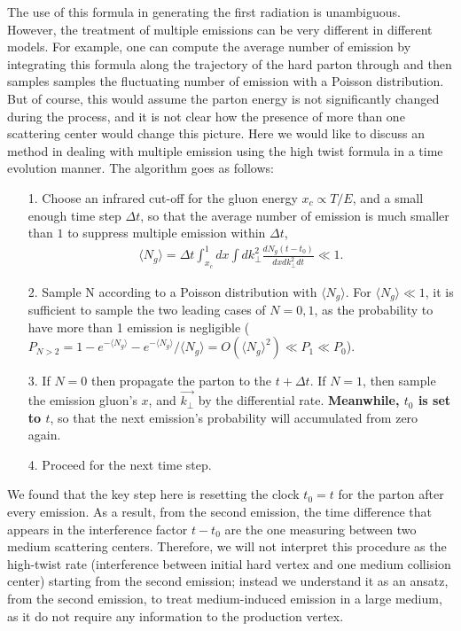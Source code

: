 The use of this formula in generating the first radiation is unambiguous. 
However, the treatment of multiple emissions can be very different in different models.
For example, one can compute the average number of emission by integrating this formula along the trajectory of the hard parton through and then samples samples the fluctuating number of emission with a Poisson distribution.
But of course, this would assume the parton energy is not significantly changed during the process, and it is not clear how the presence of more than one scattering center would change this picture.
Here we would like to discuss an method in dealing with multiple emission using the high twist formula in a time evolution manner.
The algorithm goes as follows:
\begin{itemize}
\item[1.] Choose an infrared cut-off for the gluon energy $x_c \propto T/E$, and a small enough time step $\Delta t$, so that the average number of emission is much smaller than $1$ to suppress multiple emission within $\Delta t$,
\begin{eqnarray}
\langle N_g \rangle = \Delta t \int_{x_c}^1 dx \int dk_\perp^2 \frac{dN_g(t-t_0)}{dx dk_\perp^2 dt} \ll 1.
\end{eqnarray}
\item[2.] Sample N according to a Poisson distribution with $\langle N_g \rangle$. For $\langle N_g \rangle \ll 1$, it is sufficient to sample the two leading cases of $N=0, 1$, as the probability to have more than 1 emission is negligible ($P_{N>2} = 1-e^{-\langle N_g \rangle}-e^{-\langle N_g \rangle}/\langle N_g \rangle = O(\langle N_g \rangle^2) \ll P_1 \ll P_0$).
\item[3.] If $N=0$ then propagate the parton to the $t+\Delta t$. If $N=1$, then sample the emission gluon's $x$, and $\vec{k_\perp}$ by the differential rate. {\bf Meanwhile, $t_0$ is set to $t$}, so that the next emission's probability will accumulated from zero again.
\item[4.] Proceed for the next time step.
\end{itemize}
We found that the key step here is resetting the clock $t_0 = t$ for the parton after every emission.
As a result, from the second emission, the time difference that appears in the interference factor $t-t_0$ are the one measuring between two medium scattering centers.
Therefore, we will not interpret this procedure as the high-twist rate (interference between initial hard vertex and one medium collision center) starting from the second emission;
instead we understand it as an ansatz, from the second emission, to treat medium-induced emission in a large medium, as it do not require any information to the production vertex.

